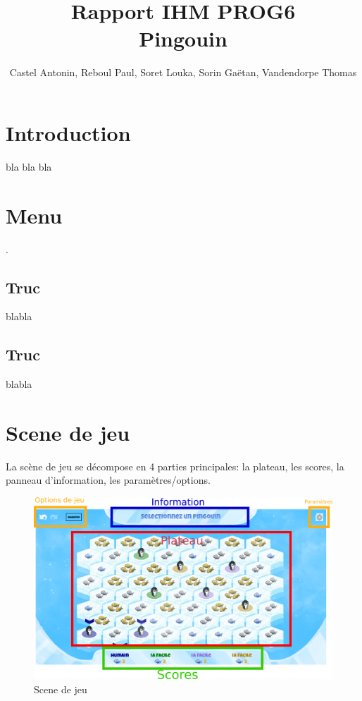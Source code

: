 \documentclass{report}
\title{\textbf{Rapport IHM PROG6}\\Pingouin}
\author{Castel Antonin, Reboul Paul, Soret Louka, Sorin Gaëtan, Vandendorpe Thomas}
\begin{document}
\maketitle{}
\tableofcontents
\chapter{Introduction}
bla bla bla
\chapter{Menu}.
\section{Truc}
blabla

\section{Truc}
blabla


\chapter{Scene de jeu}
La scène de jeu se décompose en 4 parties principales: la plateau, les scores, la panneau d'information, les paramètres/options.

\begin{figure}
\begin{center}
   \includegraphics[width=20cm]{image/plateauIHM.png}    
\end{center}
\caption{Scene de jeu}
\end{figure}
\end{document}
